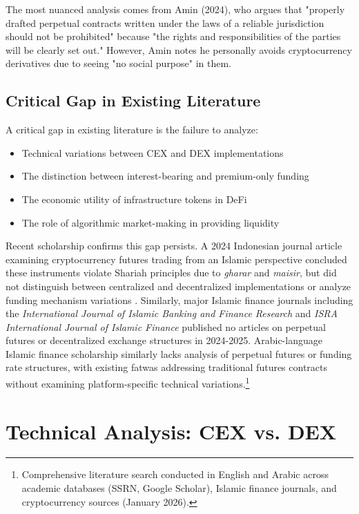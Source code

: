 \documentclass[10pt,twocolumn]{article}
\begin{document}
The most nuanced analysis comes from Amin (2024), who argues that "properly drafted perpetual contracts written under the laws of a reliable jurisdiction should not be prohibited" because "the rights and responsibilities of the parties will be clearly set out." However, Amin notes he personally avoids cryptocurrency derivatives due to seeing "no social purpose" in them.

\subsection{Critical Gap in Existing Literature}

A critical gap in existing literature is the failure to analyze:
\begin{itemize}
    \item Technical variations between CEX and DEX implementations
    \item The distinction between interest-bearing and premium-only funding
    \item The economic utility of infrastructure tokens in DeFi
    \item The role of algorithmic market-making in providing liquidity
\end{itemize}

Recent scholarship confirms this gap persists. A 2024 Indonesian journal article examining cryptocurrency futures trading from an Islamic perspective concluded these instruments violate Shariah principles due to \textit{gharar} and \textit{maisir}, but did not distinguish between centralized and decentralized implementations or analyze funding mechanism variations \citep{Indonesian2024}. Similarly, major Islamic finance journals including the \textit{International Journal of Islamic Banking and Finance Research} and \textit{ISRA International Journal of Islamic Finance} published no articles on perpetual futures or decentralized exchange structures in 2024-2025. Arabic-language Islamic finance scholarship similarly lacks analysis of perpetual futures or funding rate structures, with existing fatwas addressing traditional futures contracts without examining platform-specific technical variations.\footnote{Comprehensive literature search conducted in English and Arabic across academic databases (SSRN, Google Scholar), Islamic finance journals, and cryptocurrency sources (January 2026).}

\section{Technical Analysis: CEX vs. DEX}
\end{document}
